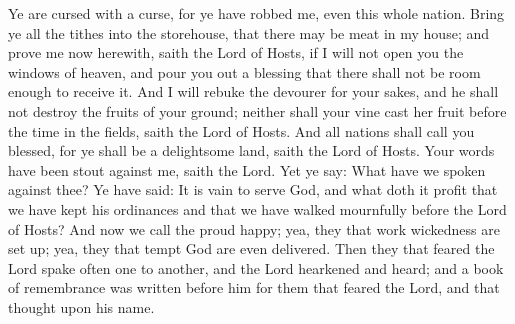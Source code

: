 Ye are cursed with a curse, for ye have robbed me, even this whole nation.
\bverse \iffalse Bring ye all the tithes into the storehouse, that there may be meat in my house; and prove me now herewith, saith the Lord of Hosts, if I will not open you the windows of heaven, and pour you out a blessing that there shall not be room enough to receive it. \fi
Bring ye all the tithes into the storehouse, that there may be meat in my house; and prove me now herewith, saith the Lord of Hosts, if I will not open you the windows of heaven, and pour you out a blessing that there shall not be room enough to receive it.
\bverse \iffalse And I will rebuke the devourer for your sakes, and he shall not destroy the fruits of your ground; neither shall your vine cast her fruit before the time in the fields, saith the Lord of Hosts. \fi
And I will rebuke the devourer for your sakes, and he shall not destroy the fruits of your ground; neither shall your vine cast her fruit before the time in the fields, saith the Lord of Hosts.
\bverse \iffalse And all nations shall call you blessed, for ye shall be a delightsome land, saith the Lord of Hosts. \fi
And all nations shall call you blessed, for ye shall be a delightsome land, saith the Lord of Hosts.
\bverse \iffalse Your words have been stout against me, saith the Lord. Yet ye say: What have we spoken against thee? \fi
Your words have been stout against me, saith the Lord. Yet ye say: What have we spoken against thee?
\bverse \iffalse Ye have said: It is vain to serve God, and what doth it profit that we have kept his ordinances and that we have walked mournfully before the Lord of Hosts? \fi
Ye have said: It is vain to serve God, and what doth it profit that we have kept his ordinances and that we have walked mournfully before the Lord of Hosts?
\bverse \iffalse And now we call the proud happy; yea, they that work wickedness are set up; yea, they that tempt God are even delivered. \fi
And now we call the proud happy; yea, they that work wickedness are set up; yea, they that tempt God are even delivered.
\bverse \iffalse Then they that feared the Lord spake often one to another, and the Lord hearkened and heard; and a book of remembrance was written before him for them that feared the Lord, and that thought upon his name. \fi
Then they that feared the Lord spake often one to another, and the Lord hearkened and heard; and a book of remembrance was written before him for them that feared the Lord, and that thought upon his name.
